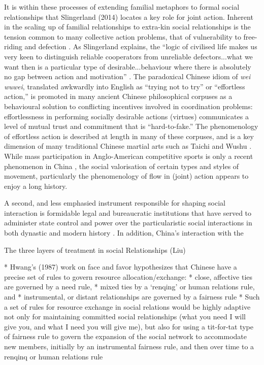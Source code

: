 {%
It is within these processes of extending familial metaphors to formal social relationships that Slingerland (2014) locates a key role for joint action. Inherent in the scaling up of familial relationships to extra-kin social relationships is the tension common to many collective action problems, that of vulnerability to free-riding and defection \citep{Cosmides2013}.
As Slingerland explains, the ``logic of civilised life makes us very keen to distinguish reliable cooperators from unreliable defectors...what we want then is a particular type of desirable...behaviour where there is absolutely no gap between action and motivation'' \citep[192]{Slingerland2014}. The paradoxical Chinese idiom of \textit{wei wuwei}, translated awkwardly into English as ``trying not to try'' or ``effortless action,'' is promoted in many ancient Chinese philosophical corpuses as a behavioural solution to conflicting incentives involved in coordination problems: effortlessness in performing socially desirable actions (virtues) communicates a level of mutual trust and commitment that is ``hard-to-fake.''  The phenomenology of effortless action is described at length in many of these corpuses, and is a key dimension of many traditional Chinese martial arts such as Taichi and Wushu \citep{Morris1998}. While mass participation in Anglo-American competitive sports is only a recent phenomenon in China \citep{Brownell2008}, the social valorisation of certain types and styles of movement, particularly the phenomenology of flow in (joint) action appears to enjoy a long history.


A second, and less emphasied instrument responsible for shaping social interaction is  formidable legal and bureaucratic institutions that have served to administer state control and power over the particularistic social interactions in both dynastic and modern history \citep[]{Liu2017}.  In addition, China's interaction with the

The three layers of treatment in social Relationships (Liu)

* Hwang’s (1987) work on face and favor hypothesizes that Chinese have a precise set of rules to govern resource allocation/exchange:
    * close, affective ties are governed by a need rule,
    * mixed ties by a ‘renqing’ or human relations rule, and
    * instrumental, or distant relationships are governed by a fairness rule
* Such a set of rules for resource exchange in social relations would be highly adaptive not only for maintaining committed social relationships (what you need I will give you, and what I need you will give me), but also for using a tit-for-tat type of fairness rule to govern the expansion of the social network to accommodate new members, initially by an instrumental fairness rule, and then over time to a renqinq or human relations rule

}

